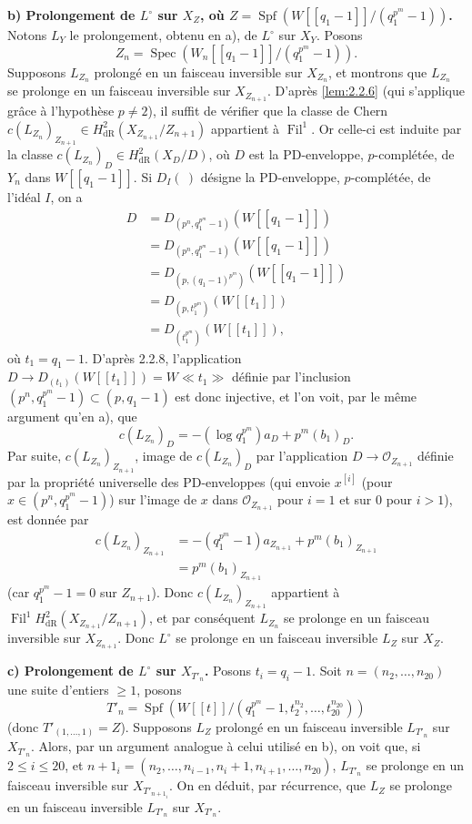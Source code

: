 \documentclass[12pt,a4paper]{article}
\theoremstyle{plain}
\theoremstyle{definition}
\theoremstyle{remark}
\DeclareMathOperator{\Fil}{Fil}
\DeclareMathOperator{\Spec}{Spec}
\DeclareMathOperator{\Spf}{Spf}
\providecommand{\Spec}{\operatorname{Spec}}
\begin{document}
\textbf{b) Prolongement de $L^\circ$ sur $X_Z$, o\`u $Z = \Spf(W[[q_1-1]]/(q_1^{p^m} - 1))$.} Notons $L_Y$ le prolongement, obtenu en a), de $L^\circ$ sur $X_Y$. Posons
\[
Z_n = \Spec(W_n[[q_1-1]]/(q_1^{p^m} - 1)).
\]
Supposons $L_{Z_n}$ prolong\'e en un faisceau inversible sur $X_{Z_n}$, et montrons que $L_{Z_n}$ se prolonge en un faisceau inversible sur $X_{Z_{n+1}}$. D'apr\`es \ref{lem:2.2.6} (qui s'applique gr\^ace \`a l'hypoth\`ese $p \neq 2$), il suffit de v\'erifier que la classe de Chern $c(L_{Z_n})_{Z_{n+1}} \in H^2_\mathrm{dR}(X_{Z_{n+1}}/Z_{n+1})$ appartient \`a $\Fil^1$. Or celle-ci est induite par la classe $c(L_{Z_n})_D \in H^2_\mathrm{dR}(X_D/D)$, o\`u $D$ est la PD-enveloppe, $p$-compl\'et\'ee, de $Y_n$ dans $W[[q_1-1]]$. Si $D_I(~)$ d\'esigne la PD-enveloppe, $p$-compl\'et\'ee, de l'id\'eal $I$, on a
\begin{align*}
D &= D_{(p^n, q_1^{p^m} - 1)}(W[[q_1-1]]) \\
&= D_{(p^n, q_1^{p^m} - 1)}(W[[q_1-1]]) \\
&= D_{(p, (q_1-1)^{p^m})}(W[[q_1-1]]) \\
&= D_{(p, t_1^{p^m})}(W[[t_1]]) \\
&= D_{(t_1^{p^m})}(W[[t_1]]),
\end{align*}
o\`u $t_1 = q_1 - 1$. D'apr\`es 2.2.8, l'application $D \to D_{(t_1)}(W[[t_1]]) = W\ll t_1 \gg$ d\'efinie par l'inclusion $(p^n, q_1^{p^m} - 1) \subset (p, q_1 - 1)$ est donc injective, et l'on voit, par le m\^eme argument qu'en a), que
\[
c(L_{Z_n})_D = -(\log q_1^{p^m})a_D + p^m (b_1)_D.
\]
Par suite, $c(L_{Z_n})_{Z_{n+1}}$, image de $c(L_{Z_n})_D$ par l'application $D \to \mathcal{O}_{Z_{n+1}}$ d\'efinie par la propri\'et\'e universelle des PD-enveloppes (qui envoie $x^{[i]}$ (pour $x \in (p^n, q_1^{p^m} - 1)$) sur l'image de $x$ dans $\mathcal{O}_{Z_{n+1}}$ pour $i = 1$ et sur $0$ pour $i > 1$), est donn\'ee par
\begin{align*}
c(L_{Z_n})_{Z_{n+1}} &= -(q_1^{p^m} - 1)a_{Z_{n+1}} + p^m (b_1)_{Z_{n+1}} \\
&= p^m (b_1)_{Z_{n+1}}
\end{align*}
(car $q_1^{p^m} - 1 = 0$ sur $Z_{n+1}$). Donc $c(L_{Z_n})_{Z_{n+1}}$ appartient \`a $\Fil^1 H^2_\mathrm{dR}(X_{Z_{n+1}}/Z_{n+1})$, et par cons\'equent $L_{Z_n}$ se prolonge en un faisceau inversible sur $X_{Z_{n+1}}$. Donc $L^\circ$ se prolonge en un faisceau inversible $L_Z$ sur $X_Z$.

\textbf{c) Prolongement de $L^\circ$ sur $X_{T'_n}$.} Posons $t_i = q_i - 1$. Soit $n = (n_2, \ldots, n_{20})$ une suite d'entiers $\geqslant 1$, posons
\[
T'_n = \Spf(W[[t]]/(q_1^{p^m} - 1, t_2^{n_2}, \ldots, t_{20}^{n_{20}}))
\]
(donc $T'_{(1,\ldots,1)} = Z$). Supposons $L_Z$ prolong\'e en un faisceau inversible $L_{T'_n}$ sur $X_{T'_n}$. Alors, par un argument analogue \`a celui utilis\'e en b), on voit que, si $2 \leqslant i \leqslant 20$, et $n+1_i = (n_2, \ldots, n_{i-1}, n_i+1, n_{i+1}, \ldots, n_{20})$, $L_{T'_n}$ se prolonge en un faisceau inversible sur $X_{T'_{n+1_i}}$. On en d\'eduit, par r\'ecurrence, que $L_Z$ se prolonge en un faisceau inversible $L_{T'_n}$ sur $X_{T'_n}$.
\end{document}
